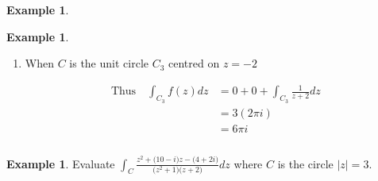 \documentclass[11pt,a4paper]{article}
\theoremstyle{definition}
\newtheorem{example}[thm]{Example}
\begin{document}
\begin{example}
\begin{example}
\begin{enumerate}
Clearly $i$ is in the enclosed region. Thus by  Cauchy Goursat $\quad  \displaystyle{\int_{C_2} f(z)dz = \sum^1_{r=1} \int f(z)dz}$
$$f(z) = \frac{-i}{z - i} + \frac{1 + i}{z + i} + \frac{3}{z + 2}$$

So that $\quad  \displaystyle{\int_{C_2}f(z)dz = -i \int_{C_2} \frac{1}{z - i}dz + \big(1 + i\big)\underbrace{\int_{C_2} \frac{1}{z + i}dz}_0 + 3 \underbrace{\int_{C_2}\frac{1}{z + 2}dz}_0}$


\begin{align*}
\therefore\quad  \int_Cf(z) dz  & = - i \int_{C_2} \frac{1}{z - i}dz\\
& = -i \int^{2\pi}_0\\
& = 2\pi\\
\end{align*}




\item When $C$ is the unit circle $C_3$ centred on $z = -2$


\begin{figure}[H]
\centering
{}
\end{figure}











\begin{align*}
\text{Thus}\quad  \int_{C_3}f(z)dz & = 0 + 0 + \int_{C_3} \frac{1}{z + 2}dz\\
& = 3(2\pi i)\\
& = 6\pi i\\\\
\end{align*}
\end{enumerate}
\end{example}

\begin{example}
Evaluate $\displaystyle{\int_C\frac{z^2 + \big(10- i\big)z - \big(4 + 2i\big)}{\big(z^2 + 1\big)\big(z + 2\big)}dz}$ where $C$ is the circle $\left|z\right|  = 3$.\\



\end{example}
\end{example}
\end{document}
